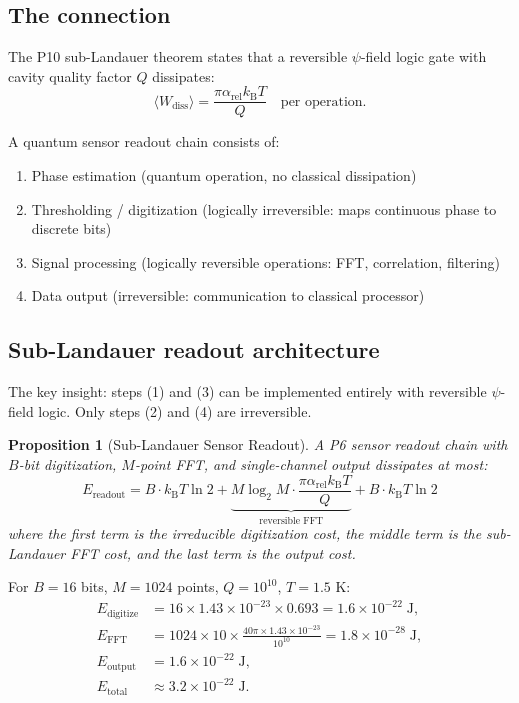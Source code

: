 \documentclass[11pt]{article}
\newtheorem{proposition}[theorem]{Proposition}
\theoremstyle{definition}
\theoremstyle{remark}
\newcommand{\kB}{k_{\mathrm{B}}}
\begin{document}
\subsection{The connection}

The P10 sub-Landauer theorem states that a reversible $\psi$-field
logic gate with cavity quality factor $Q$ dissipates:
\begin{equation}
\langle W_{\mathrm{diss}}\rangle = \frac{\pi\alpha_{\mathrm{rel}}
\kB T}{Q} \quad \text{per operation}.
\end{equation}

A quantum sensor readout chain consists of:
\begin{enumerate}
\item Phase estimation (quantum operation, no classical dissipation)
\item Thresholding / digitization (logically irreversible: maps
continuous phase to discrete bits)
\item Signal processing (logically reversible operations: FFT, correlation, filtering)
\item Data output (irreversible: communication to classical processor)
\end{enumerate}

\subsection{Sub-Landauer readout architecture}

The key insight: steps (1) and (3) can be implemented entirely with
reversible $\psi$-field logic. Only steps (2) and (4) are irreversible.

\begin{proposition}[Sub-Landauer Sensor Readout]
A P6 sensor readout chain with $B$-bit digitization, $M$-point FFT,
and single-channel output dissipates at most:
\begin{equation}
\boxed{E_{\mathrm{readout}} = B \cdot \kB T\ln 2 +
\underbrace{M\log_2 M \cdot \frac{\pi\alpha_{\mathrm{rel}}\kB T}{Q}}_{
\text{reversible FFT}} + B \cdot \kB T\ln 2}
\end{equation}
where the first term is the irreducible digitization cost, the middle
term is the sub-Landauer FFT cost, and the last term is the output cost.
\end{proposition}

For $B = 16$ bits, $M = 1024$ points, $Q = 10^{10}$, $T = 1.5$ K:
\begin{align}
E_{\mathrm{digitize}} &= 16 \times 1.43\times 10^{-23} \times 0.693
= 1.6 \times 10^{-22}\;\mathrm{J}, \\
E_{\mathrm{FFT}} &= 1024 \times 10 \times \frac{40\pi \times 1.43
\times 10^{-23}}{10^{10}} = 1.8 \times 10^{-28}\;\mathrm{J}, \\
E_{\mathrm{output}} &= 1.6\times 10^{-22}\;\mathrm{J}, \\
E_{\mathrm{total}} &\approx 3.2\times 10^{-22}\;\mathrm{J}.
\end{align}
\end{document}
